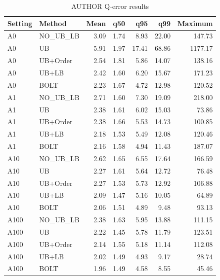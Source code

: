 \begin{table}[H]
\centering
\small
\setlength{\tabcolsep}{5pt}
\caption{AUTHOR Q-error results}
\label{tab:A_accuracy_AUTHOR}
\begin{tabular}{@{}llrrrrr@{}}
\toprule
Setting & Method & Mean & q50 & q95 & q99 & Maximum \\
\midrule
A0 & NO\_UB_LB & 3.09 & 1.74 & 8.93 & 22.00 & 147.73 \\
A0 & UB & 5.91 & 1.97 & 17.41 & 68.86 & 1177.17 \\
A0 & UB+Order & 2.54 & 1.81 & 5.86 & 14.07 & 138.16 \\
A0 & UB+LB & 2.42 & 1.60 & 6.20 & 15.67 & 171.23 \\
A0 & BOLT & 2.23 & 1.67 & 4.72 & 12.98 & 120.52 \\
A1 & NO\_UB_LB & 2.71 & 1.60 & 7.30 & 19.09 & 218.00 \\
A1 & UB & 2.38 & 1.61 & 6.02 & 15.03 & 73.86 \\
A1 & UB+Order & 2.38 & 1.66 & 5.53 & 14.73 & 100.85 \\
A1 & UB+LB & 2.18 & 1.53 & 5.49 & 12.08 & 120.46 \\
A1 & BOLT & 2.16 & 1.58 & 4.94 & 11.43 & 187.07 \\
A10 & NO\_UB_LB & 2.62 & 1.65 & 6.55 & 17.64 & 166.59 \\
A10 & UB & 2.27 & 1.61 & 5.64 & 12.72 & 76.48 \\
A10 & UB+Order & 2.27 & 1.53 & 5.73 & 12.92 & 106.88 \\
A10 & UB+LB & 2.09 & 1.47 & 5.16 & 10.05 & 64.89 \\
A10 & BOLT & 2.06 & 1.51 & 4.89 & 9.48 & 93.13 \\
A100 & NO\_UB_LB & 2.38 & 1.63 & 5.95 & 13.88 & 111.15 \\
A100 & UB & 2.22 & 1.45 & 5.78 & 11.79 & 123.51 \\
A100 & UB+Order & 2.14 & 1.55 & 5.18 & 11.14 & 112.08 \\
A100 & UB+LB & 2.02 & 1.49 & 4.93 & 9.17 & 28.74 \\
A100 & BOLT & 1.96 & 1.49 & 4.58 & 8.55 & 45.46 \\
\bottomrule
\end{tabular}
\end{table}
